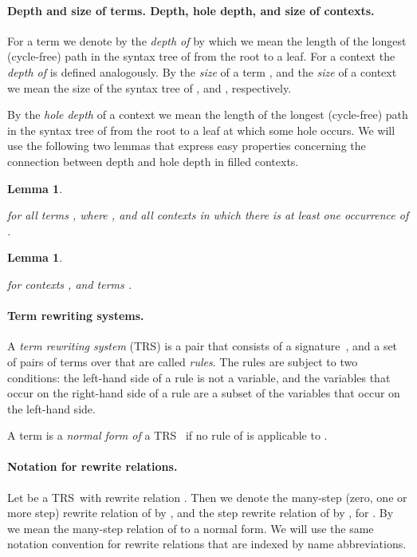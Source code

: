 \documentclass[
submission
]{dmtcs-episciences-tampered}
\newcommand{\TRS}{TRS}
\theoremstyle{plain}
\newtheorem{lemma}[theorem]{Lemma}
\theoremstyle{definition}
\begin{document}
  
\paragraph{Depth and size of terms. Depth, hole depth, and size of contexts.} 
  For a term  we denote by  the \emph{depth of }
  by which we mean the length of the longest (cycle-free) path in the syntax tree of  from the root to a leaf. 
  For a context  the \emph{depth  of } is defined analogously.  
  By the \emph{size } of a term , and the \emph{size } of a context 
  we mean the size of the syntax tree of , and , respectively. 
  
  By the \emph{hole depth } of a context 
    we mean the length of the longest (cycle-free) path in the syntax tree of  from the root to a leaf at which some hole occurs.
  We will use the following two lemmas that express easy properties concerning the connection between depth and hole depth in
  filled contexts.   

  \begin{lemma}\label{lem:holedepth:vs:depth}
    
    for all terms , where ,
    and all contexts  in which there is at least one occurrence of . 
  \end{lemma}
  
  
  \begin{lemma}\label{lem:depth:cxtap:vs:depth:holedepth}
      
    for contexts , and terms .
  \end{lemma}  


\paragraph{Term rewriting systems.}
  A \emph{term rewriting system} (\TRS) is a pair  that consists of a signature~,
  and a set  of pairs of terms over  that are called \emph{rules}.
  The rules are subject to two conditions: the left-hand side of a rule is not a variable,
  and the variables that occur on the right-hand side of a rule are a subset of the variables that occur on the left-hand side.
  
  A term  is a \emph{normal form of} a TRS~ if no rule of  is applicable to .
    
    
  
    
    
    

\paragraph{Notation for rewrite relations.}
  Let  be a \TRS\ with rewrite relation . 
  Then we denote the many-step (zero, one or more step) rewrite relation of  by ,
  and the  step rewrite relation of  by , for . 
  By  we mean the many-step relation of  to a normal form. 
  We will use the same notation convention for rewrite relations that are indexed by name abbreviations.
  
\end{document}
